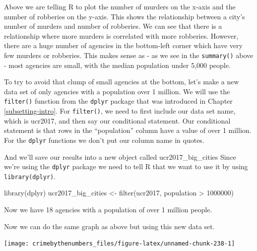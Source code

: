 \documentclass[
]{krantz}
\makeatletter
\newenvironment{Shaded}{\begin{snugshade}}{\end{snugshade}}
\newcommand{\DecValTok}[1]{\textcolor[rgb]{0.06,0.06,0.06}{#1}}
\newcommand{\FunctionTok}[1]{\textcolor[rgb]{0,0,0}{#1}}
\newcommand{\NormalTok}[1]{#1}
\newcommand{\OtherTok}[1]{\textcolor[rgb]{0.37,0.37,0.37}{#1}}
\newcommand{\SpecialCharTok}[1]{\textcolor[rgb]{0,0,0}{#1}}
\newenvironment{kframe}{%
\medskip{}
\setlength{\fboxsep}{.8em}
 \def\at@end@of@kframe{}%
 \ifinner\ifhmode%
  \def\at@end@of@kframe{\end{minipage}}%
  \begin{minipage}{\columnwidth}%
 \fi\fi%
 \def\FrameCommand##1{\hskip\@totalleftmargin \hskip-\fboxsep
 \colorbox{shadecolor}{##1}\hskip-\fboxsep
     \hskip-\linewidth \hskip-\@totalleftmargin \hskip\columnwidth}%
 \MakeFramed {\advance\hsize-\width
   \@totalleftmargin\z@ \linewidth\hsize
   \@setminipage}}%
 {\par\unskip\endMakeFramed%
 \at@end@of@kframe}
\renewenvironment{Shaded}{\begin{kframe}}{\end{kframe}}
\makeatother
\begin{document}
Above we are telling R to plot the number of murders on the x-axis and the number of robberies on the y-axis. This shows the relationship between a city's number of murders and number of robberies. We can see that there is a relationship where more murders is correlated with more robberies. However, there are a huge number of agencies in the bottom-left corner which have very few murders or robberies. This makes sense as - as we see in the \texttt{summary()} above - most agencies are small, with the median population under 5,000 people.

To try to avoid that clump of small agencies at the bottom, let's make a new data set of only agencies with a population over 1 million. We will use the \texttt{filter()} function from the \texttt{dplyr} package that was introduced in Chapter \ref{subsetting-intro}. For \texttt{filter()}, we need to first include our data set name, which is ucr2017, and then say our conditional statement. Our conditional statement is that rows in the ``population'' column have a value of over 1 million. For the \texttt{dplyr} functions we don't put our column name in quotes.

And we'll save our results into a new object called ucr2017\_big\_cities Since we're using the \texttt{dplyr} package we need to tell R that we want to use it by using \texttt{library(dplyr)}.

\begin{Shaded}
\begin{Highlighting}[]
\FunctionTok{library}\NormalTok{(dplyr)}
\NormalTok{ucr2017\_big\_cities }\OtherTok{\textless{}{-}} \FunctionTok{filter}\NormalTok{(ucr2017, population }\SpecialCharTok{\textgreater{}} \DecValTok{1000000}\NormalTok{) }
\end{Highlighting}
\end{Shaded}

Now we have 18 agencies with a population of over 1 million people.

Now we can do the same graph as above but using this new data set.

\begin{Shaded}
\end{Shaded}

\begin{center}\texttt{[image: crimebythenumbers\_files/figure-latex/unnamed-chunk-238-1]} \end{center}
\end{document}
